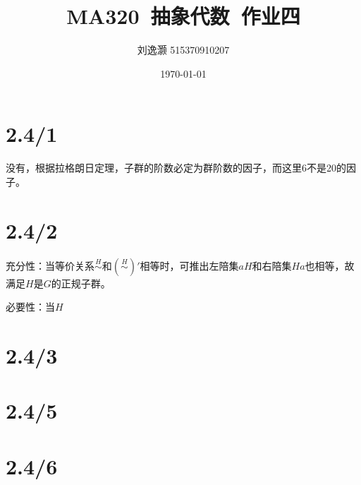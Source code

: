\documentclass{article}
\title{MA320\ 抽象代数\ 作业四}
\author{刘逸灏 515370910207}
\date{\today}
\begin{document}
\maketitle

\section{2.4/1}
没有，根据拉格朗日定理，子群的阶数必定为群阶数的因子，而这里6不是20的因子。

\section{2.4/2}
充分性：当等价关系$\mathop{\sim}\limits^H$和$(\mathop{\sim}\limits^H)'$相等时，可推出左陪集$aH$和右陪集$Ha$也相等，故满足$H$是$G$的正规子群。

必要性：当$H$

\section{2.4/3}
\section{2.4/5}
\section{2.4/6}
\end{document}
